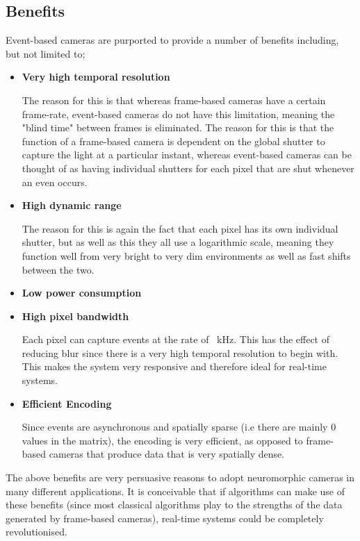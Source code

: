 \subsection{Benefits}
Event-based cameras are purported to provide a number of benefits including, but not limited to;

\begin{itemize}
      \item \textbf{Very high temporal resolution}

            The reason for this is that whereas frame-based cameras have a certain frame-rate, event-based cameras do not have this limitation, meaning the "blind time" between frames is eliminated. The reason for this is that the function of a frame-based camera is dependent on the global shutter to capture the light at a particular instant, whereas event-based cameras can be thought of as having individual shutters for each pixel that are shut whenever an even occurs.
      \item \textbf{High dynamic range}

            The reason for this is again the fact that each pixel has its own individual shutter, but as well as this they all use a logarithmic scale, meaning they function well from very bright to very dim environments as well as fast shifts between the two.
      \item \textbf{Low power consumption}
      \item \textbf{High pixel bandwidth}

            Each pixel can capture events at the rate of ~kHz. This has the effect of reducing blur since there is a very high temporal resolution to begin with. This makes the system very responsive and therefore ideal for real-time systems.
      \item \textbf{Efficient Encoding}

            Since events are asynchronous and spatially sparse (i.e there are mainly 0 values in the matrix), the encoding is very efficient, as opposed to frame-based cameras that produce data that is very spatially dense.
\end{itemize}

The above benefits are very persuasive reasons to adopt neuromorphic cameras in many different applications. It is conceivable that if algorithms can make use of these benefits (since most classical algorithms play to the strengths of the data generated by frame-based cameras), real-time systems could be completely revolutionised.


